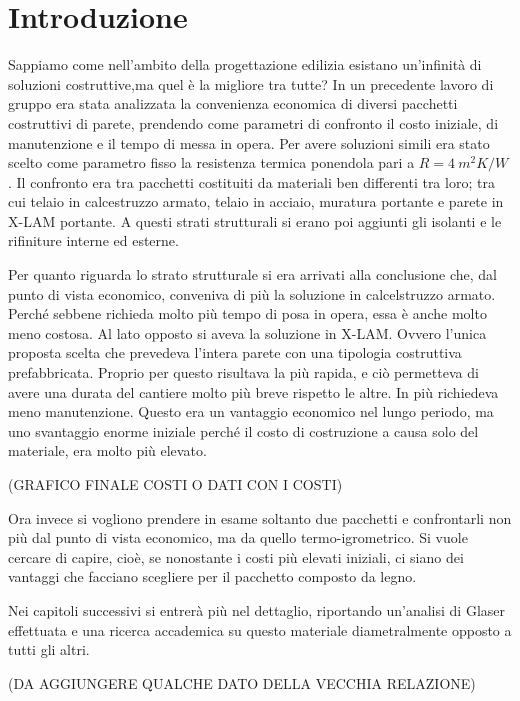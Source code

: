 \chapter{Introduzione}
Sappiamo come nell'ambito della progettazione edilizia esistano un'infinità di soluzioni costruttive,ma quel è la migliore tra tutte? 
In un precedente lavoro di gruppo era stata analizzata la convenienza economica di diversi pacchetti costruttivi di parete, prendendo come parametri di confronto il costo iniziale, di manutenzione e il tempo di messa in opera. 
Per avere soluzioni simili era stato scelto come parametro fisso la resistenza termica ponendola pari a $R=\SI{4}{m^2K\per W}$.
Il confronto era tra pacchetti costituiti da materiali ben differenti tra loro; tra cui telaio in calcestruzzo armato, telaio in acciaio, muratura portante e parete in X-LAM portante.
A questi strati strutturali si erano poi aggiunti gli isolanti e le rifiniture interne ed esterne.

Per quanto riguarda lo strato strutturale si era arrivati alla conclusione che, dal punto di vista economico, conveniva di più la soluzione in calcelstruzzo armato. 
Perché sebbene richieda molto più tempo di posa in opera, essa è anche molto meno costosa. 
Al lato opposto si aveva la soluzione in X-LAM. 
Ovvero l'unica proposta scelta che prevedeva l'intera parete con una tipologia costruttiva prefabbricata.
Proprio per questo risultava la più rapida, e ciò permetteva di avere una durata del cantiere molto più breve rispetto le altre. 
In più richiedeva meno manutenzione.
Questo era un vantaggio economico nel lungo periodo, ma uno svantaggio enorme iniziale perché il costo di costruzione a causa solo del materiale, era molto più elevato.

(GRAFICO FINALE COSTI O DATI CON I COSTI)

Ora invece si vogliono prendere in esame soltanto due pacchetti e confrontarli non più dal punto di vista economico, ma da quello termo-igrometrico.
Si vuole cercare di capire, cioè, se nonostante i costi più elevati iniziali, ci siano dei vantaggi che facciano scegliere per il pacchetto composto da legno.

Nei capitoli successivi si entrerà più nel dettaglio, riportando un'analisi di Glaser effettuata e una ricerca accademica su questo materiale diametralmente opposto a tutti gli altri.

(DA AGGIUNGERE QUALCHE DATO DELLA VECCHIA RELAZIONE)


